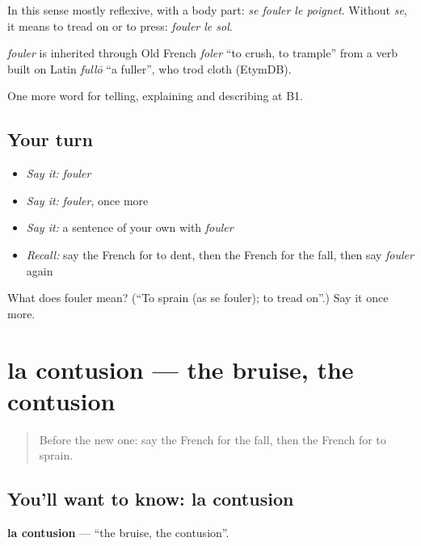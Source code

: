 In this sense mostly reflexive, with a body part: \emph{se fouler le poignet}. Without \emph{se}, it means to tread on or to press: \emph{fouler le sol}.

\begin{cousinweb}
\emph{fouler} is inherited through Old French \emph{foler} \textquotedblleft{}to crush, to trample\textquotedblright{} from a verb built on Latin \emph{fullō} \textquotedblleft{}a fuller\textquotedblright{}, who trod cloth (EtymDB).
\end{cousinweb}

\begin{grammarlens}[title={What you've built}]
One more word for telling, explaining and describing at B1.
\end{grammarlens}

\subsection*{Your turn}
\begin{itemize}
\raggedright
  \item \emph{Say it:} \emph{fouler}
  \item \emph{Say it:} \emph{fouler}, once more
  \item \emph{Say it:} a sentence of your own with \emph{fouler}
  \item \emph{Recall:} say the French for to dent, then the French for the fall, then say \emph{fouler} again
\end{itemize}

\begin{tcolorbox}[breakable,colback=teal!4,colframe=teal!35!black,title={Before you move on}]
What does fouler mean? (\textquotedblleft{}To sprain (as se fouler); to tread on\textquotedblright{}.) Say it once more.
\end{tcolorbox}
\section[la contusion]{la contusion — the bruise, the contusion}

\label{lesson:FR-C299-contusion}



\begin{quote}
Before the new one: say the French for the fall, then the French for to sprain.
\end{quote}

\subsection*{You'll want to know: la contusion}
\textbf{la contusion} — \textquotedblleft{}the bruise, the contusion\textquotedblright{}.

